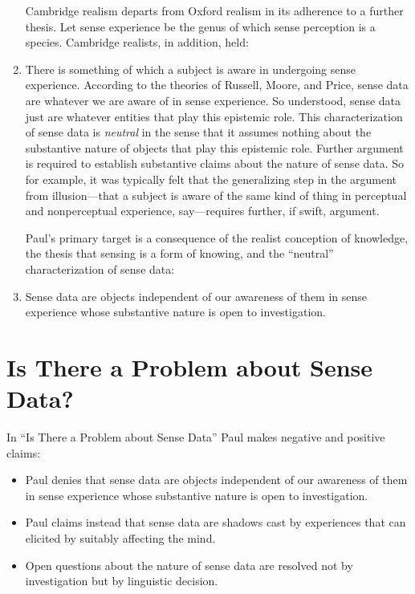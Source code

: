 \documentclass[11pt]{article}
\begin{document}
\begin{enumerate}
Cambridge realism departs from Oxford realism in its adherence to a further thesis. Let sense experience be the genus of which sense perception is a species. Cambridge realists, in addition, held:
    \item There is something of which a subject is aware in undergoing sense experience.
According to the theories of Russell, Moore, and Price, sense data are whatever we are aware of in sense experience. So understood, sense data just are whatever entities that play this epistemic role. This characterization of sense data is \emph{neutral} in the sense that it assumes nothing about the substantive nature of objects that play this epistemic role. Further argument is required to establish substantive claims about the nature of sense data. So for example, it was typically felt that the generalizing step in the argument from illusion---that a subject is aware of the same kind of thing in perceptual and nonperceptual experience, say---requires further, if swift, argument.

Paul's primary target is a consequence of the realist conception of knowledge, the thesis that sensing is a form of knowing, and the ``neutral'' characterization of sense data:
    \item Sense data are objects independent of our awareness of them in sense experience whose substantive nature is open to investigation.
\end{enumerate}


\section{Is There a Problem about Sense Data?} %
\label{sec:is_there_a_problem_about_sense_data_}
In ``Is There a Problem about Sense Data'' Paul makes negative and positive claims:
\begin{itemize}
    \item Paul denies that sense data are objects independent of our awareness of them in sense experience whose substantive nature is open to investigation.
    \item Paul claims instead that sense data are shadows cast by experiences that can elicited by suitably affecting the mind.
    \item Open questions about the nature of sense data are resolved not by investigation but by linguistic decision.
\end{itemize}
\end{document}
